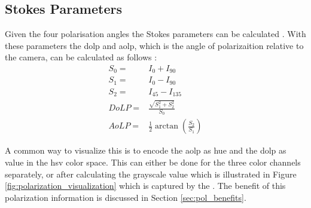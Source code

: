 \subsection{Stokes Parameters}
Given the four polarisation angles the Stokes parameters can be calculated \cite{piascoSurveyVisualBasedLocalization2018}.
With these parameters the \gls{dolp} and \gls{aolp}, which is the angle of polarizaition relative to the camera, can be calculated as follows \cite{piascoSurveyVisualBasedLocalization2018}:
\begin{align}
    S_0 =  & I_0 + I_{90}                                      \\
    S_1 =  & I_0 - I_{90}                                      \\
    S_2 =  & I_{45} - I_{135}                                  \\
    DoLP = & \frac{\sqrt{S_1^2 + S_2^2}}{S_0}                  \\
    AoLP = & \frac{1}{2} \arctan{\left(\frac{S_2}{S_1}\right)}
\end{align}

A common way to visualize this is to encode the \gls{aolp} as hue and the \gls{dolp} as value in the \gls{hsv} color space.
This can either be done for the three color channels separately, or after calculating the grayscale value which is illustrated in Figure \ref{fig:polarization_visualization} which is captured by the \sr.
The benefit of this polarization information is discussed in Section \ref{sec:pol_benefits}.

